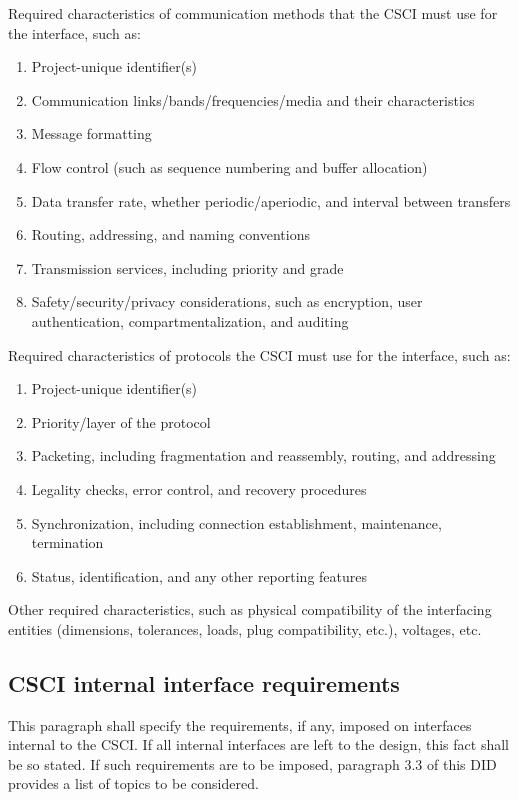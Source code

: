 Required characteristics of communication methods that the CSCI must use
for the interface, such as:

\begin{enumerate}
\itemsep1pt\parskip0pt
\item
  Project-unique identifier(s)
\item
  Communication links/bands/frequencies/media and their characteristics
\item
  Message formatting
\item
  Flow control (such as sequence numbering and buffer allocation)
\item
  Data transfer rate, whether periodic/aperiodic, and interval between
  transfers
\item
  Routing, addressing, and naming conventions
\item
  Transmission services, including priority and grade
\item
  Safety/security/privacy considerations, such as encryption, user
  authentication, compartmentalization, and auditing
\end{enumerate}

Required characteristics of protocols the CSCI must use for the
interface, such as:

\begin{enumerate}
\itemsep1pt\parskip0pt
\item
  Project-unique identifier(s)
\item
  Priority/layer of the protocol
\item
  Packeting, including fragmentation and reassembly, routing, and
  addressing
\item
  Legality checks, error control, and recovery procedures
\item
  Synchronization, including connection establishment, maintenance,
  termination
\item
  Status, identification, and any other reporting features
\end{enumerate}

Other required characteristics, such as physical compatibility of the
interfacing entities (dimensions, tolerances, loads, plug compatibility,
etc.), voltages, etc.

\subsection{CSCI internal interface requirements}

This paragraph shall specify the requirements, if any, imposed on
interfaces internal to the CSCI. If all internal interfaces are left to
the design, this fact shall be so stated. If such requirements are to be
imposed, paragraph 3.3 of this DID provides a list of topics to be
considered.

